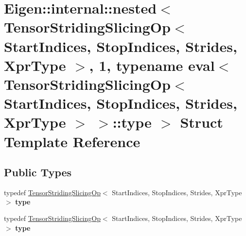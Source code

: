 \hypertarget{struct_eigen_1_1internal_1_1nested_3_01_tensor_striding_slicing_op_3_01_start_indices_00_01_stopc629a6763d7f6c225084b7a41b6d4822}{}\section{Eigen\+:\+:internal\+:\+:nested$<$ Tensor\+Striding\+Slicing\+Op$<$ Start\+Indices, Stop\+Indices, Strides, Xpr\+Type $>$, 1, typename eval$<$ Tensor\+Striding\+Slicing\+Op$<$ Start\+Indices, Stop\+Indices, Strides, Xpr\+Type $>$ $>$\+:\+:type $>$ Struct Template Reference}
\label{struct_eigen_1_1internal_1_1nested_3_01_tensor_striding_slicing_op_3_01_start_indices_00_01_stopc629a6763d7f6c225084b7a41b6d4822}
\subsection*{Public Types}
\begin{DoxyCompactItemize}
\item 
\mbox{\label{struct_eigen_1_1internal_1_1nested_3_01_tensor_striding_slicing_op_3_01_start_indices_00_01_stopc629a6763d7f6c225084b7a41b6d4822_aa26a2e231b37885c35a04be54b1ac1bc}} 
typedef \hyperlink{class_eigen_1_1_tensor_striding_slicing_op}{Tensor\+Striding\+Slicing\+Op}$<$ Start\+Indices, Stop\+Indices, Strides, Xpr\+Type $>$ {\bfseries type}
\item 
\mbox{\label{struct_eigen_1_1internal_1_1nested_3_01_tensor_striding_slicing_op_3_01_start_indices_00_01_stopc629a6763d7f6c225084b7a41b6d4822_aa26a2e231b37885c35a04be54b1ac1bc}} 
typedef \hyperlink{class_eigen_1_1_tensor_striding_slicing_op}{Tensor\+Striding\+Slicing\+Op}$<$ Start\+Indices, Stop\+Indices, Strides, Xpr\+Type $>$ {\bfseries type}
\end{DoxyCompactItemize}


